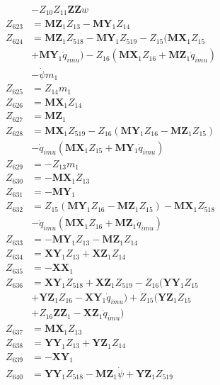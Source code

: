 \begin{multicols}{2}
\begin{align}
&- Z_{10}Z_{11}\mathbf{ZZ}w \nonumber \\
Z_{623} &= \mathbf{MZ}_1Z_{13} - \mathbf{MY}_1Z_{14} \nonumber \\
Z_{624} &= \mathbf{MZ}_1Z_{518} - \mathbf{MY}_1Z_{519} - Z_{15}(\mathbf{MX}_1Z_{15}  \nonumber \\
&+ \mathbf{MY}_1\dot{q}_{imu}) - Z_{16}(\mathbf{MX}_1Z_{16} + \mathbf{MZ}_1\dot{q}_{imu})  \nonumber \\
&- \dot{\psi}m_1 \nonumber \\
Z_{625} &= Z_{14}m_1 \nonumber \\
Z_{626} &= \mathbf{MX}_1Z_{14} \nonumber \\
Z_{627} &= \mathbf{MZ}_1 \nonumber \\
Z_{628} &= \mathbf{MX}_1Z_{519} - Z_{16}(\mathbf{MY}_1Z_{16} - \mathbf{MZ}_1Z_{15})  \nonumber \\
&- \dot{q}_{imu}(\mathbf{MX}_1Z_{15} + \mathbf{MY}_1\dot{q}_{imu}) \nonumber \\
Z_{629} &= -Z_{13}m_1 \nonumber \\
Z_{630} &= -\mathbf{MX}_1Z_{13} \nonumber \\
Z_{631} &= -\mathbf{MY}_1 \nonumber \\
Z_{632} &= Z_{15}(\mathbf{MY}_1Z_{16} - \mathbf{MZ}_1Z_{15}) - \mathbf{MX}_1Z_{518}  \nonumber \\
&- \dot{q}_{imu}(\mathbf{MX}_1Z_{16} + \mathbf{MZ}_1\dot{q}_{imu}) \nonumber \\
Z_{633} &= - \mathbf{MY}_1Z_{13} - \mathbf{MZ}_1Z_{14} \nonumber \\
Z_{634} &= \mathbf{XY}_1Z_{13} + \mathbf{XZ}_1Z_{14} \nonumber \\
Z_{635} &= -\mathbf{XX}_1 \nonumber \\
Z_{636} &= \mathbf{XY}_1Z_{518} + \mathbf{XZ}_1Z_{519} - Z_{16}(\mathbf{YY}_1Z_{15}  \nonumber \\
&+ \mathbf{YZ}_1Z_{16} - \mathbf{XY}_1\dot{q}_{imu}) + Z_{15}(\mathbf{YZ}_1Z_{15}  \nonumber \\
&+ Z_{16}\mathbf{ZZ}_1 - \mathbf{XZ}_1\dot{q}_{imu}) \nonumber \\
Z_{637} &= \mathbf{MX}_1Z_{13} \nonumber \\
Z_{638} &= \mathbf{YY}_1Z_{13} + \mathbf{YZ}_1Z_{14} \nonumber \\
Z_{639} &= -\mathbf{XY}_1 \nonumber \\
Z_{640} &= \mathbf{YY}_1Z_{518} - \mathbf{MZ}_1\dot{\psi} + \mathbf{YZ}_1Z_{519}  \nonumber \\

\end{align}
\end{multicols}
